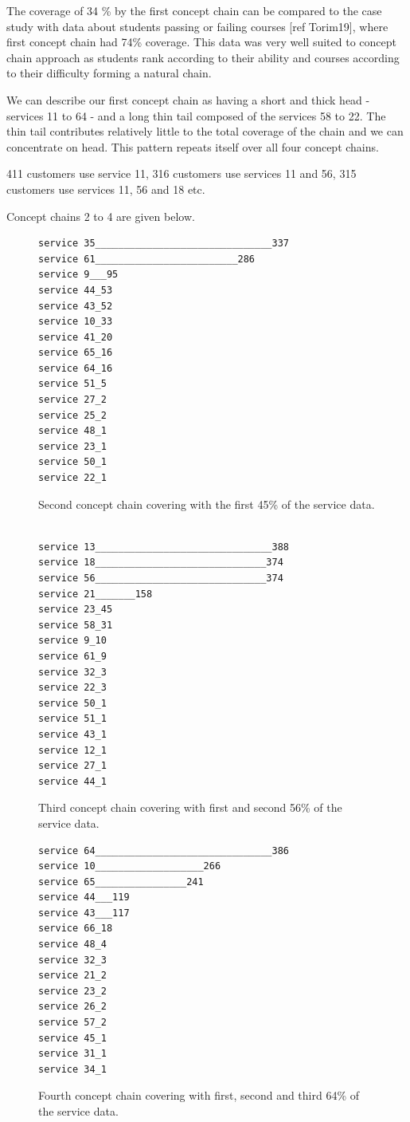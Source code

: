 \documentclass[acmconf,authordraft]{acmart}
\begin{document}
The coverage of 34 \% by the first concept chain can be compared to the case study with data about students passing or failing  courses [ref Torim19], where first concept chain had   74\% coverage. This data was very well suited to concept chain approach as students rank according to their ability and courses according to their difficulty forming a natural chain.

We can describe our first concept chain as having a short and thick head - services 11 to 64 - and a long thin tail composed of the services 58 to 22. The thin tail contributes relatively little to the total coverage of the chain and we can concentrate on  head. This pattern repeats itself over all four concept chains.

411 customers use service 11, 316 customers use services 11 and 56, 315 customers use services 11, 56 and 18 etc.

Concept chains 2 to 4 are given below.


\begin{figure}[!htb]
\vspace{.5cm}
\begin{verbatim}
service 35_______________________________337
service 61_________________________286
service 9___95
service 44_53
service 43_52
service 10_33
service 41_20
service 65_16
service 64_16
service 51_5
service 27_2
service 25_2
service 48_1
service 23_1
service 50_1
service 22_1
\end{verbatim}

\caption{Second concept chain covering with the first 45\% of the service data.}
\label{fig:cc2}
\end{figure}

\begin{figure}[!htb]
\vspace{.5cm}
\begin{verbatim}

service 13_______________________________388
service 18______________________________374
service 56______________________________374
service 21_______158
service 23_45
service 58_31
service 9_10
service 61_9
service 32_3
service 22_3
service 50_1
service 51_1
service 43_1
service 12_1
service 27_1
service 44_1
\end{verbatim}

\caption{Third concept chain covering with first and second 56\% of the service data.}
\label{fig:cc3}
\end{figure}


\begin{figure}[!htb]
\vspace{.5cm}
\begin{verbatim}
service 64_______________________________386
service 10___________________266
service 65________________241
service 44___119
service 43___117
service 66_18
service 48_4
service 32_3
service 21_2
service 23_2
service 26_2
service 57_2
service 45_1
service 31_1
service 34_1
\end{verbatim}

\caption{Fourth concept chain covering with first, second and third 64\% of the service data.}
\label{fig:cc4}
\end{figure}
\end{document}
